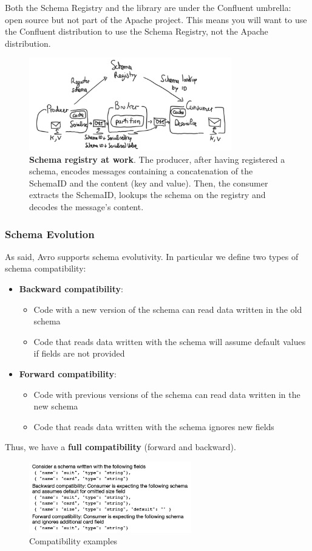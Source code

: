 \documentclass[10pt,a4paper]{article}
\begin{document}
Both the Schema Registry and the library are under the Confluent umbrella: open source but not part of the Apache project. This means you will want to use the Confluent distribution to use the Schema Registry, not the Apache distribution.
\begin{figure}[ht!]
 \hfill \includegraphics[width=250pt]{images/schema-registry-at-work}\hspace*{\fill}
 \caption{\textbf{Schema registry at work}. The producer, after having registered a schema, encodes messages containing a concatenation of the SchemaID and the content (key and value). Then, the consumer extracts the SchemaID, lookups the schema on the registry and decodes the message's content.}
\end{figure} 
\subsubsection{Schema Evolution}
As said, Avro supports schema evolutivity. In particular we define two types of schema compatibility:
\begin{itemize}
	\item \textbf{Backward compatibility}:
	\begin{itemize}
		\item Code with a new version of the schema can read data written in the old schema
		\item Code that reads data written with the schema will assume default values if fields are not provided
	\end{itemize}
	\item \textbf{Forward compatibility}:
	\begin{itemize}
		\item Code with previous versions of the schema can read data written in the new schema
		\item Code that reads data written with the schema ignores new fields
	\end{itemize}
\end{itemize}
Thus, we have a \textbf{full compatibility} (forward and backward).
\begin{figure}[ht!]
 \hfill \includegraphics[width=200pt]{images/avro-compatibility-ex}\hspace*{\fill}
 \caption{Compatibility examples}
\end{figure} 
\end{document}
